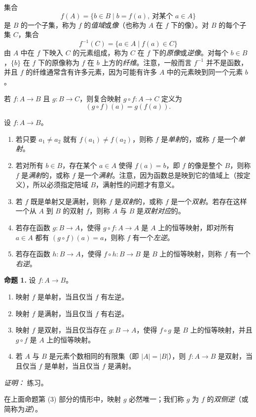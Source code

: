 集合
\[
  f(A)=\{b\in B\mid b=f(a),\ \text{对某个 }a\in A\}
\]
是 $B$ 的一个子集，称为 $f$ 的\emph{值域}或\emph{像}（也称为 $A$ 在 $f$ 下的像）。对 $B$ 的每个子集 $C$，集合
\[
  f^{-1}(C)=\{a\in A\mid f(a)\in C\}
\]
由 $A$ 中在 $f$ 下映入 $C$ 的元素组成，称为 $C$ 在 $f$ 下的\emph{原像}或\emph{逆像}。对每个 $b\in B$，$\{b\}$ 在 $f$ 下的原像称为 $f$ 在 $b$ 上方的\emph{纤维}。注意，一般而言 $f^{-1}$ 并不是函数，并且 $f$ 的纤维通常含有许多元素，因为可能有许多 $A$ 中的元素映到同一个元素 $b$。

若 $f:A\to B$ 且 $g:B\to C$，则复合映射 $g\circ f:A\to C$ 定义为
\[
  (g\circ f)(a)=g(f(a)).
\]

设 $f:A\to B$。
\begin{enumerate}[label=(\arabic*)]
  \item 若只要 $a_1\neq a_2$ 就有 $f(a_1)\neq f(a_2)$，则称 $f$ 是\emph{单射}的，或称 $f$ 是一个\emph{单射}。
  \item 若对所有 $b\in B$，存在某个 $a\in A$ 使得 $f(a)=b$，即 $f$ 的像是整个 $B$，则称 $f$ 是\emph{满射}的，或称 $f$ 是一个\emph{满射}。注意，因为函数总是映到它的值域上（按定义），所以必须指定陪域 $B$，满射性的问题才有意义。
  \item 若 $f$ 既是单射又是满射，则称 $f$ 是\emph{双射}的，或称 $f$ 是一个\emph{双射}。若存在这样一个从 $A$ 到 $B$ 的双射 $f$，则称 $A$ 与 $B$ 是\emph{双射对应}的。
  \item 若存在函数 $g:B\to A$，使得 $g\circ f:A\to A$ 是 $A$ 上的恒等映射，即对所有 $a\in A$ 都有 $(g\circ f)(a)=a$，则称 $f$ 有一个\emph{左逆}。
  \item 若存在函数 $h:B\to A$，使得 $f\circ h:B\to B$ 是 $B$ 上的恒等映射，则称 $f$ 有一个\emph{右逆}。
\end{enumerate}

\medskip
\noindent\textbf{命题 1.} 设 $f:A\to B$。
\begin{enumerate}[label=(\arabic*)]
  \item 映射 $f$ 是单射，当且仅当 $f$ 有左逆。
  \item 映射 $f$ 是满射，当且仅当 $f$ 有右逆。
  \item 映射 $f$ 是双射，当且仅当存在 $g:B\to A$，使得 $f\circ g$ 是 $B$ 上的恒等映射，并且 $g\circ f$ 是 $A$ 上的恒等映射。
  \item 若 $A$ 与 $B$ 是元素个数相同的有限集（即 $|A|=|B|$），则 $f:A\to B$ 是双射，当且仅当 $f$ 是单射，当且仅当 $f$ 是满射。
\end{enumerate}
\noindent\textit{证明：} 练习。

在上面命题第 (3) 部分的情形中，映射 $g$ 必然唯一；我们称 $g$ 为 $f$ 的\emph{双侧逆}（或简称为\emph{逆}）。

